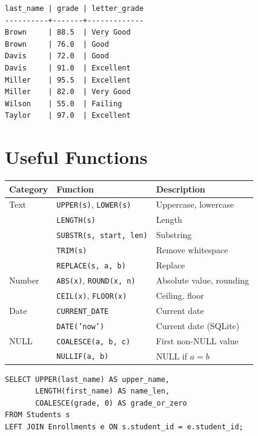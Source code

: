 \begin{codeoutput}
\begin{verbatim}
last_name | grade | letter_grade
----------+-------+-------------
Brown     | 88.5  | Very Good
Brown     | 76.0  | Good
Davis     | 72.0  | Good
Davis     | 91.0  | Excellent
Miller    | 95.5  | Excellent
Miller    | 82.0  | Very Good
Wilson    | 55.0  | Failing
Taylor    | 97.0  | Excellent
\end{verbatim}
\end{codeoutput}

\section{Useful Functions}

\begin{keyformulas}[title=\textbf{Common Scalar Functions}]
\begin{center}
\begin{tabular}{lll}
\toprule
\textbf{Category} & \textbf{Function} & \textbf{Description} \\
\midrule
Text & \texttt{UPPER(s)}, \texttt{LOWER(s)} & Uppercase, lowercase \\
     & \texttt{LENGTH(s)} & Length \\
     & \texttt{SUBSTR(s, start, len)} & Substring \\
     & \texttt{TRIM(s)} & Remove whitespace \\
     & \texttt{REPLACE(s, a, b)} & Replace \\
Number & \texttt{ABS(x)}, \texttt{ROUND(x, n)} & Absolute value, rounding \\
       & \texttt{CEIL(x)}, \texttt{FLOOR(x)} & Ceiling, floor \\
Date   & \texttt{CURRENT\_DATE} & Current date \\
       & \texttt{DATE('now')} & Current date (SQLite) \\
NULL   & \texttt{COALESCE(a, b, c)} & First non-NULL value \\
       & \texttt{NULLIF(a, b)} & NULL if $a = b$ \\
\bottomrule
\end{tabular}
\end{center}
\end{keyformulas}

\begin{codeblock}[title=\textbf{Function Examples}]
\begin{verbatim}
SELECT UPPER(last_name) AS upper_name,
       LENGTH(first_name) AS name_len,
       COALESCE(grade, 0) AS grade_or_zero
FROM Students s
LEFT JOIN Enrollments e ON s.student_id = e.student_id;
\end{verbatim}
\end{codeblock}

